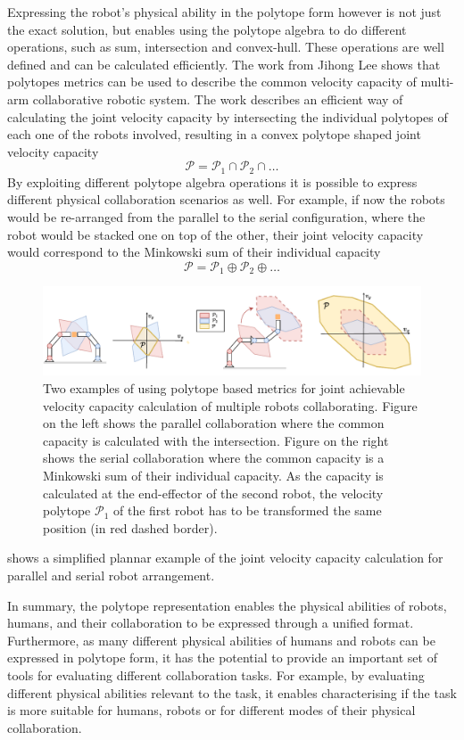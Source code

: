 Expressing the robot's physical ability in the polytope form however is not just the exact solution, but enables using the polytope algebra to do different operations, such as sum, intersection and convex-hull. These operations are well defined and can be calculated efficiently. The work from Jihong Lee \cite{lee2001velocity} shows that polytopes metrics can be used to describe the common velocity capacity of multi-arm collaborative robotic system.  The work describes an efficient way of calculating the joint velocity capacity by intersecting the individual polytopes of each one of the robots involved, resulting in a convex polytope shaped joint velocity capacity $$\mathcal{P}=\mathcal{P}_1 \cap \mathcal{P}_2  \cap \ldots$$
By exploiting different polytope algebra operations it is possible to express different physical collaboration scenarios as well. For example, if now the robots would be re-arranged from the parallel to the serial configuration, where the robot would be stacked one on top of the other, their joint velocity capacity would correspond to the Minkowski sum of their individual capacity $$\mathcal{P}=\mathcal{P}_1 \oplus \mathcal{P}_2  \oplus \ldots$$

\begin{figure}[!h]
    \centering
    \includegraphics[width=\linewidth]{Chapters/imgs/collab_serial_parallel.pdf}
    \caption{Two examples of using polytope based metrics for joint achievable velocity capacity calculation of multiple robots collaborating. Figure on the left shows the parallel collaboration where the common capacity is calculated with the intersection. Figure on the right shows the serial collaboration where the common capacity is a Minkowski sum of their individual capacity. As the capacity is calculated at the end-effector of the second robot, the velocity polytope $\mathcal{P}_1$ of the first robot has to be transformed the same position (in red dashed border).}
    \label{fig:collab_serial_parallel}
\end{figure}
 shows a simplified plannar example of the joint velocity capacity calculation for parallel and serial robot arrangement.

In summary, the polytope representation enables the physical abilities of robots, humans, and their collaboration to be expressed through a unified format. Furthermore, as many different physical abilities of humans and robots can be expressed in polytope form, it has the potential to provide an important set of tools for evaluating different collaboration tasks.
For example, by evaluating different physical abilities relevant to the task, it enables characterising if the task is more suitable for humans, robots or for different modes of their physical collaboration.  


